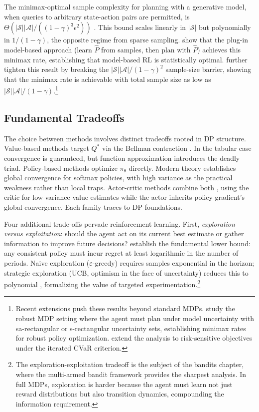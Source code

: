 The minimax-optimal sample complexity for planning with a generative model, when queries to arbitrary state-action pairs are permitted, is $\Theta(|\mathcal{S}||\mathcal{A}|/((1-\gamma)^3\epsilon^2))$ \citep{azar2013}. This bound scales linearly in $|\mathcal{S}|$ but polynomially in $1/(1-\gamma)$, the opposite regime from sparse sampling. \citet{agarwalKakadeYang2020} show that the plug-in model-based approach (learn $\hat{P}$ from samples, then plan with $\hat{P}$) achieves this minimax rate, establishing that model-based RL is statistically optimal. \citet{li2024breaking} further tighten this result by breaking the $|\mathcal{S}||\mathcal{A}|/(1-\gamma)^2$ sample-size barrier, showing that the minimax rate is achievable with total sample size as low as $|\mathcal{S}||\mathcal{A}|/(1-\gamma)$.\footnote{Recent extensions push these results beyond standard MDPs. \citet{clavier2024robust} study the robust MDP setting where the agent must plan under model uncertainty with sa-rectangular or s-rectangular uncertainty sets, establishing minimax rates for robust policy optimization. \citet{wang2025cvar} extend the analysis to risk-sensitive objectives under the iterated CVaR criterion.}

\subsection{Fundamental Tradeoffs}
\label{sec:tradeoffs}

The choice between methods involves distinct tradeoffs rooted in DP structure. Value-based methods target $Q^*$ via the Bellman contraction \citep{szepesvari2010}. In the tabular case convergence is guaranteed, but function approximation introduces the deadly triad. Policy-based methods optimize $\pi_\theta$ directly. Modern theory \citep{agarwal2021theory} establishes global convergence for softmax policies, with high variance as the practical weakness rather than local traps. Actor-critic methods combine both \citep{konda2000}, using the critic for low-variance value estimates while the actor inherits policy gradient's global convergence. Each family traces to DP foundations.

Four additional trade-offs pervade reinforcement learning. First, \emph{exploration versus exploitation}: should the agent act on its current best estimate or gather information to improve future decisions? \citet{LaiRobbins1985} establish the fundamental lower bound: any consistent policy must incur regret at least logarithmic in the number of periods. Naive exploration ($\varepsilon$-greedy) requires samples exponential in the horizon; strategic exploration (UCB, optimism in the face of uncertainty) reduces this to polynomial \citep{auer2002}, formalizing the value of targeted experimentation.\footnote{The exploration-exploitation tradeoff is the subject of the bandits chapter, where the multi-armed bandit framework provides the sharpest analysis. In full MDPs, exploration is harder because the agent must learn not just reward distributions but also transition dynamics, compounding the information requirement.}

